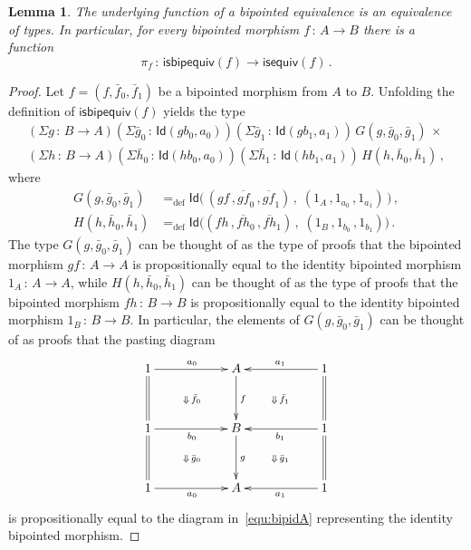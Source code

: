\documentclass[10pt,a4paper,oneside,reqno]{amsart}
\numberwithin{equation}{section}
\theoremstyle{mythm}
\newtheorem{lemma}[theorem]{Lemma}
\theoremstyle{mydef}
\theoremstyle{myrmk}
\newcommand{\defeq}{=_{\mathrm{def}}}
\newcommand{\co}{\,{:}\,}
\newcommand{\isequiv}{\mathsf{isequiv}}
\newcommand{\Id}{\mathsf{Id}}
\newcommand{\isbipequiv}{\mathsf{isbipequiv}}
\begin{document}
\begin{lemma} The underlying function of a bipointed equivalence is an equivalence of types. In particular,
for every bipointed morphism $f \co A \to B$  there is a  function 
\[
\pi_f \co \isbipequiv(f) \to \isequiv(f) \, .
\]
\end{lemma} 

\begin{proof} Let $f = (f, \bar{f}_0, \bar{f}_1)$ be a bipointed morphism from $A$ to $B$. Unfolding  the definition
of  $\isbipequiv(f)$ yields the type
\begin{multline}
\label{equ:unfoldisbipequiv} 
(\Sigma g \co B \to  A)
(\Sigma \bar{g}_0 \co \Id( g b_0, a_0)) 
(\Sigma  \bar{g}_1 \co \Id( g b_1, a_1)) \, 
 G(g,\bar{g}_0,\bar{g}_1) \, \times \\
 (\Sigma h \co B \to A)
 (\Sigma \bar{h}_0 \co \Id ( h b_0,  a_0))
 (\Sigma \bar{h}_1 \co  \Id ( h b_1,  a_1)) \, 
 H(h,\bar{h}_0,\bar{h}_1)   \, ,
\end{multline}
where 
\begin{align*}
G(g,\bar{g}_0,\bar{g}_1) & \defeq 
\Id 
\big( \, 
( 
g f \, ,  \overline{gf}_0  \, ,    \overline{gf}_1 
) \, , \;
( 
1_A \, ,  1_{a_0} \, , 1_{a_1} 
) \, 
\big)  \, , \\
H(h,\bar{h}_0,\bar{h}_1) & \defeq 
\Id 
\big( 
(
 f  h \, ,   \overline{fh}_0 \, , \overline{fh}_1   
 ) \, , \; 
 ( 
 1_B \, ,  1_{b_0} \, , 1_{b_1} 
 ) 
 \big) \, .
\end{align*}
The type $G(g, \bar{g}_0, \bar{g}_1)$ can be thought of as the type of proofs that the
bipointed morphism  $g  f \co A \to A$ is propositionally equal to the identity bipointed morphism
$1_A \co A \to A$, while  $H(h, \bar{h}_0, \bar{h}_1)$ can be thought of as the type of proofs that the
bipointed morphism  $f  h \co B \to B$ is propositionally equal to the identity bipointed morphism
$1_B \co B \to B$. In particular, the elements of $G(g, \bar{g}_0, \bar{g}_1)$ can be thought of as
proofs that the pasting diagram 
\[
\xymatrix@C=2cm@R=1.2cm{
1    \ar[r]^{a_0} \ar@{=}[d]  \ar@{}[dr]|{\Downarrow \, \bar{f}_0} & A  \ar[d]^{f} & 1  \ar[l]_{a_1} \ar@{=}[d] \ar@{}[dl]|{\Downarrow \,  \bar{f}_1} \\
1 \ar[r]_{b_0}   \ar@{}[dr]|{\Downarrow \, \bar{g}_0}  \ar@{=}[d] & B \ar[d]^g   & 1 \ar[l]^{b_1} \ar@{=}[d] \ar@{}[dl]|{\Downarrow \,  \bar{g}_1} \\
1 \ar[r]_{a_0}  & A   & 1 \ar[l]^{a_1}}
\]
is propositionally equal to the diagram in~\eqref{equ:bipidA} representing the identity bipointed morphism. 


\end{proof}
\end{document}
